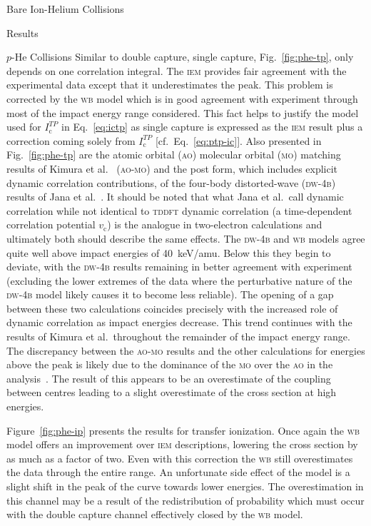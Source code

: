 \documentclass[a5paper, 9 pt]{extreport}
\begin{document}
\begin{chapter}{Bare Ion-Helium Collisions \label{chap:p-he2p-he}}
\begin{section}{Results \label{sec:phe2p-res}}
\begin{subsection}{\texorpdfstring{$p$}{p}-He Collisions \label{sec:phe-res}}
         Similar to double capture, single capture, Fig.~\ref{fig:phe-tp}, only depends on one
         correlation integral. The \textsc{iem} provides fair agreement with the experimental data
         except that it underestimates the peak. This problem is corrected by the \textsc{wb} model
         which is in good agreement with experiment through most of the impact energy range considered.
         This fact helps to justify the model used for $I^{TP}_\mathrm{c}$ in Eq.~\eqref{eq:ictp} as
         single capture is expressed as the \textsc{iem} result plus a correction coming solely from
         $I^{TP}_\mathrm{c}$ [cf.\ Eq.~\eqref{eq:ptp-ic}]. Also presented in Fig.~\ref{fig:phe-tp} are
         the atomic orbital (\textsc{ao}) molecular orbital (\textsc{mo}) matching results of Kimura et
         al.~\cite{KL-86} (\textsc{ao-mo}) and the post form, which includes explicit dynamic
         correlation contributions, of the four-body distorted-wave (\textsc{dw-4b}) results of Jana et
         al.~\cite{JMP-15}. It should be noted that what Jana et al.\ call dynamic correlation while
         not identical to \textsc{tddft} dynamic correlation (a time-dependent correlation potential
         $v_\mathrm{c}$) is the analogue in two-electron calculations and ultimately both should
         describe the same effects. The \textsc{dw-4b} and \textsc{wb} models agree quite well above
         impact energies of 40~keV/amu. Below this they begin to deviate, with the \textsc{dw-4b}
         results remaining in better agreement with experiment (excluding the lower extremes of the data
         where the perturbative nature of the \textsc{dw-4b} model likely causes it to become less
         reliable). The opening of a gap between these two calculations coincides precisely with the
         increased role of dynamic correlation as impact energies decrease. This trend continues with
         the results of Kimura et al.\ throughout the remainder of the impact energy range. The
         discrepancy between the \textsc{ao-mo} results and the other calculations for energies above
         the peak is likely due to the dominance of the \textsc{mo} over the \textsc{ao} in the
         analysis~\cite{KL-86}. The result of this appears to be an overestimate of the coupling between
         centres leading to a slight overestimate of the cross section at high energies.

         Figure~\ref{fig:phe-ip} presents the results for transfer ionization. Once again the
         \textsc{wb} model offers an improvement over \textsc{iem} descriptions, lowering the cross
         section by as much as a factor of two. Even with this correction the \textsc{wb} still
         overestimates the data through the entire range. An unfortunate side effect of the model is a
         slight shift in the peak of the curve towards lower energies. The overestimation in this
         channel may be a result of the redistribution of probability which must occur with the double
         capture channel effectively closed by the \textsc{wb} model.


\end{subsection}
\end{section}
\end{chapter}
\end{document}
